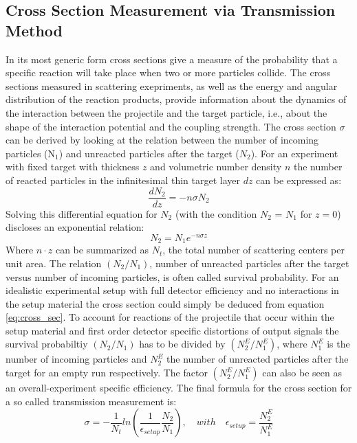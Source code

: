 \subsection{Cross Section Measurement via Transmission Method}\label{section:transmission_method}
In its most generic form cross sections give a measure of the probability that a specific reaction will take place when two or more particles collide. The cross sections  measured in scattering exepriments, as well as the energy and angular distribution of the reaction products, provide information about the dynamics of the interaction between the projectile and the target particle, i.e., about the shape of the interaction potential and the coupling strength.\newline
The cross section $\sigma$ can be derived by looking at the relation between the number of incoming particles (N$_{1}$) and unreacted particles after the target ($N_{2}$). For an experiment with fixed target with thickness $z$ and volumetric number density $n$ the number of reacted particles in the infinitesimal thin target layer $dz$ can be expressed as:
\begin{equation}
\frac{dN_{2}}{dz} = -n \sigma N_{2}
\end{equation}
Solving this differential equation for $N_{2}$ (with the condition $N_{2}$ = $N_{1}$ for $z=0$) discloses an exponential relation:
\begin{equation}
N_{2} = N_{1}e^{-n\sigma z}
\label{eq:cross_sec}
\end{equation} 
Where $n\cdot z$ can be summarized as $N_t$, the total number of scattering centers per unit area. The relation $(N_{2}/N_{1})$, number of unreacted particles after the target versus number of incoming particles, is often called survival probability. For an idealistic experimental setup with full detector efficiency and no interactions in the setup material the cross section could simply be deduced from equation \ref{eq:cross_sec}. To account for reactions of the projectile that occur within the setup material and first order detector specific distortions of output signals the survival probabiltiy $(N_{2}/N_{1})$ has to be divided by $(N_{2}^E/N_{1}^E)$, where $N_{1}^E$ is the number of incoming particles and $N_{2}^E$ the number of unreacted particles after the target for an empty run respectively. The factor $(N_{2}^E/N_{1}^E)$ can also be seen as an overall-experiment specific efficiency. The final formula for the cross section for a so called transmission measurement is:
\begin{equation}
\sigma = -\frac{1}{N_t} ln(\frac{1}{\epsilon_{setup}} \frac{N_2}{N_1}),\quad with \quad  \epsilon_{setup} = \frac{N_{2}^E}{N_{1}^E}
\label{eq:corr_cross}
\end{equation}
